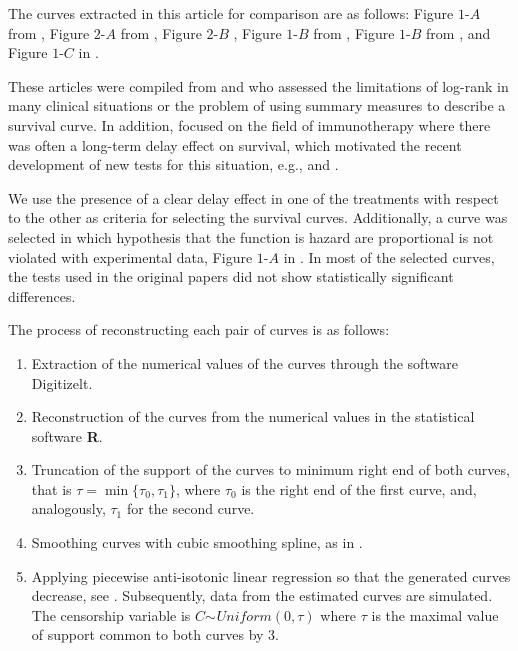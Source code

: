 \documentclass[11pt]{article}
\begin{document}
The curves extracted in this article for comparison are as follows:
Figure $1$-$A$ from \cite{borghaei2015nivolumab}, Figure $2$-$A$  from \cite{rodriguez2016phase}, Figure $2$-$B$ \cite{motzer2015nivolumab}, Figure $1$-$B$ from \cite{ferris2016nivolumab}, Figure $1$-$B$ from \cite{bellmunt2017pembrolizumab}, and  Figure $1$-$C$ in \cite{borghaei2015nivolumab}.


These articles were compiled from  \cite{su2018time} and \cite{alexander2018hazards} who assessed  the limitations of log-rank in many clinical situations or the problem of using summary measures to describe a survival curve. In addition, \cite{alexander2018hazards} focused on the field of immunotherapy where there was often a long-term delay effect on survival, which  motivated the recent development of new tests for this situation, e.g.,  \cite{xu2017designing} and \cite{xu2018designing}.


We use the presence of a clear delay effect in one of the treatments with respect to the other as criteria for selecting the survival curves. Additionally, a curve was selected in which hypothesis that the function is hazard are proportional is not violated with experimental data, Figure $1$-$A$ in \cite{rodriguez2016phase}. In most of the selected curves, the tests used in the original papers did not show statistically significant differences. 

The process of reconstructing each pair of curves is as follows:

\begin{enumerate}
	\item Extraction of the numerical values of the curves through the software Digitizelt.
	\item Reconstruction of  the curves from the numerical values  in the statistical software \textbf{\textsf{R}}.
	\item Truncation of the support of the curves to minimum right end of both curves, that is $\tau= \min\{\tau_0,\tau_1\}$, where $\tau_0$ is the right end of the first curve, and, analogously, $\tau_1$ for the second curve.    
	\item Smoothing curves with  cubic smoothing spline, as in \cite{Hast:Tibs:1990}. 
	\item Applying piecewise anti-isotonic linear regression so that the generated curves decrease, see \cite{BA03873521}. Subsequently,  data from the  estimated curves are simulated. The censorship variable is $C\sim^{} Uniform(0,\tau)$ where $\tau$ is the maximal value of support common to both curves by $3$.
	
	
\end{enumerate} 
\end{document}
